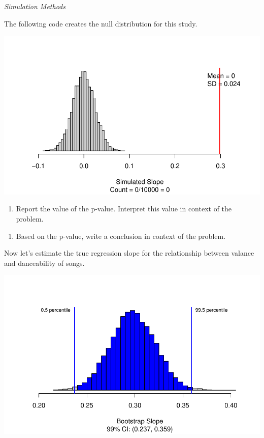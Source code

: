\documentclass[
]{report}
\providecommand{\tightlist}{%
  \setlength{\itemsep}{0pt}\setlength{\parskip}{0pt}}
\begin{document}
\emph{Simulation Methods}

The following code creates the null distribution for this study.

\begin{center}\includegraphics[width=0.7\linewidth]{14-UR-module13_review_files/figure-latex/unnamed-chunk-3-1} \end{center}

\begin{enumerate}
\def\labelenumi{\arabic{enumi}.}
\setcounter{enumi}{5}
\tightlist
\item
  Report the value of the p-value. Interpret this value in context of the problem.
\end{enumerate}

\vspace{1in}

\begin{enumerate}
\def\labelenumi{\arabic{enumi}.}
\setcounter{enumi}{6}
\tightlist
\item
  Based on the p-value, write a conclusion in context of the problem.
\end{enumerate}

\vspace{1in}

Now let's estimate the true regression slope for the relationship between valance and danceability of songs.

\begin{center}\includegraphics[width=0.7\linewidth]{14-UR-module13_review_files/figure-latex/unnamed-chunk-4-1} \end{center}
\end{document}
